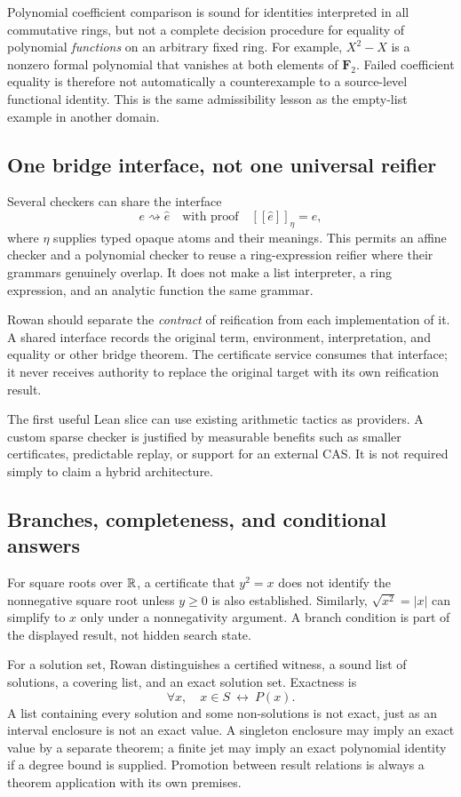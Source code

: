 \documentclass[11pt,letterpaper]{article}
\newcommand{\den}[1]{[\![#1]\!]}
\theoremstyle{definition}\newtheorem{definition}[theorem]{Definition}
\theoremstyle{remark}\newtheorem{remark}[theorem]{Remark}
\begin{document}
Polynomial coefficient comparison is sound for identities interpreted in all
commutative rings, but not a complete decision procedure for equality of
polynomial \emph{functions} on an arbitrary fixed ring. For example, $X^2-X$
is a nonzero formal polynomial that vanishes at both elements of
$\mathbf F_2$. Failed coefficient equality is therefore not automatically a
counterexample to a source-level functional identity. This is the same
admissibility lesson as the empty-list example in another domain.

\subsection{One bridge interface, not one universal reifier}
Several checkers can share the interface
\[
 e\rightsquigarrow\widehat e
 \quad\text{with proof}\quad
 \den{\widehat e}_{\eta}=e,
\]
where $\eta$ supplies typed opaque atoms and their meanings. This permits an
affine checker and a polynomial checker to reuse a ring-expression reifier
where their grammars genuinely overlap. It does not make a list interpreter,
a ring expression, and an analytic function the same grammar.

Rowan should separate the \emph{contract} of reification from each
implementation of it. A shared interface records the original term,
environment, interpretation, and equality or other bridge theorem. The
certificate service consumes that interface; it never receives authority to
replace the original target with its own reification result.

The first useful Lean slice can use existing arithmetic tactics as providers.
A custom sparse checker is justified by measurable benefits such as smaller
certificates, predictable replay, or support for an external CAS. It is not
required simply to claim a hybrid architecture.

\subsection{Branches, completeness, and conditional answers}
For square roots over $\mathbb R$, a certificate that $y^2=x$ does not identify the
nonnegative square root unless $y\ge0$ is also established. Similarly,
$\sqrt{x^2}=|x|$ can simplify to $x$ only under a nonnegativity argument.
A branch condition is part of the displayed result, not hidden search state.

For a solution set, Rowan distinguishes a certified witness, a sound list of
solutions, a covering list, and an exact solution set. Exactness is
\[
 \forall x,\quad x\in S\ \longleftrightarrow\ P(x).
\]
A list containing every solution and some non-solutions is not exact, just as
an interval enclosure is not an exact value. A singleton enclosure may imply
an exact value by a separate theorem; a finite jet may imply an exact
polynomial identity if a degree bound is supplied. Promotion between result
relations is always a theorem application with its own premises.
\end{document}
